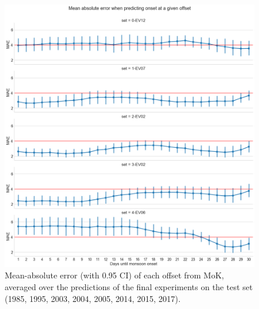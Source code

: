 \begin{figure}[h]
  \centering
  \includegraphics[width=\linewidth]{./99_appendix/img/prediction_accuracy_offset_split.png}
  \caption{Mean-absolute error (with 0.95 CI) of each offset from MoK, averaged over the predictions of the final experiments on the test set (1985, 1995, 2003, 2004, 2005, 2014, 2015, 2017).}
  \label{apx:prediction_accuracy_offset_ci}
\end{figure}

